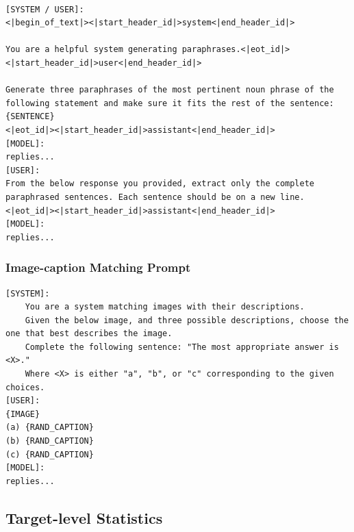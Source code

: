 \documentclass[11pt]{article}
\begin{document}
\begin{minipage}{\linewidth}
\begin{lstlisting}[caption={Prompt Demonstration for Paraphrasing using LLaMA-3.3-70b. The bold capitalised terms in square brackets are meta-tokens that describe the role of the following text. The capitalised terms in curly braces are template variables.}, label={listing:paraphrase_prompt}, captionpos=b]

[SYSTEM / USER]:
<|begin_of_text|><|start_header_id|>system<|end_header_id|>

You are a helpful system generating paraphrases.<|eot_id|>
<|start_header_id|>user<|end_header_id|>

Generate three paraphrases of the most pertinent noun phrase of the following statement and make sure it fits the rest of the sentence: {SENTENCE}
<|eot_id|><|start_header_id|>assistant<|end_header_id|>
[MODEL]: 
replies...
[USER]:
From the below response you provided, extract only the complete paraphrased sentences. Each sentence should be on a new line.
<|eot_id|><|start_header_id|>assistant<|end_header_id|>
[MODEL]:
replies...
\end{lstlisting}
\end{minipage}

\subsubsection{Image-caption Matching Prompt}

\begin{minipage}{\linewidth}
\begin{lstlisting}[caption={Prompt Demonstration for Image-Caption Matching. The bold capitalised terms in square brackets are meta-tokens that describe the role of the following text. The capitalised terms in curly braces are template variables.}, label={listing:im_prompt}, captionpos=b]
[SYSTEM]:
    You are a system matching images with their descriptions.
    Given the below image, and three possible descriptions, choose the one that best describes the image.
    Complete the following sentence: "The most appropriate answer is <X>."
    Where <X> is either "a", "b", or "c" corresponding to the given choices.
[USER]:
{IMAGE}
(a) {RAND_CAPTION}
(b) {RAND_CAPTION}
(c) {RAND_CAPTION}
[MODEL]:
replies...
\end{lstlisting}
\end{minipage}

\subsection{Target-level Statistics}
\end{document}
